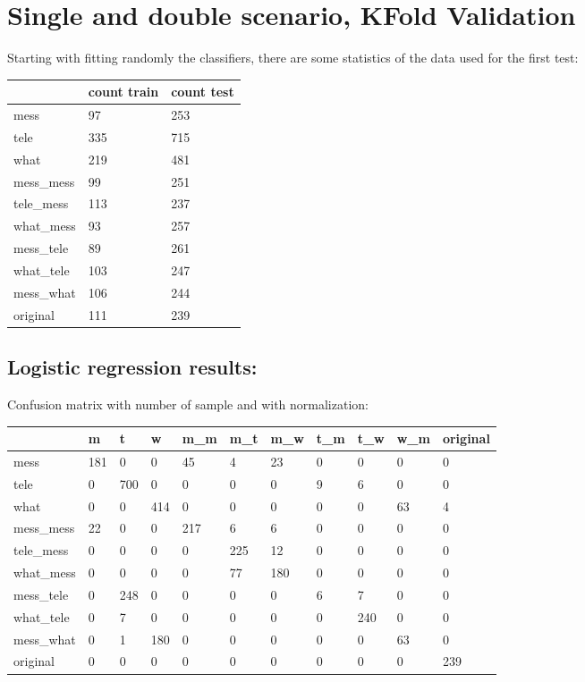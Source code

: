 

\chapter{Single and double scenario, KFold Validation}

Starting with fitting randomly the classifiers, there are some statistics of the data used for the first test: \\
 {\def\arraystretch{1.3} 
 \begin{table}[H] 
\centering 
\begin{tabular}{|l|l|l|} 
\hline 
  &count train  &count test  \\ \hline
mess  &97  &253  \\ \hline
tele  &335  &715  \\ \hline
what  &219  &481  \\ \hline
mess\_mess  &99  &251  \\ \hline
tele\_mess  &113  &237  \\ \hline
what\_mess  &93  &257  \\ \hline
mess\_tele  &89  &261  \\ \hline
what\_tele  &103  &247  \\ \hline
mess\_what  &106  &244  \\ \hline
original  &111  &239  \\ \hline
\end{tabular} 
\end{table} }
\section{Logistic regression results:} 
Confusion matrix with number of sample and with normalization:
 {\def\arraystretch{1.3} 
 \begin{table}[H] 
\centering 
\begin{tabular}{|l|l|l|l|l|l|l|l|l|l|l|} 
\hline 
  &m  &t  &w  &m\_m  &m\_t  &m\_w  &t\_m  &t\_w  &w\_m  &original  \\ \hline
mess  &181  &0  &0  &45  &4  &23  &0  &0  &0  &0  \\ \hline
tele  &0  &700  &0  &0  &0  &0  &9  &6  &0  &0  \\ \hline
what  &0  &0  &414  &0  &0  &0  &0  &0  &63  &4  \\ \hline
mess\_mess  &22  &0  &0  &217  &6  &6  &0  &0  &0  &0  \\ \hline
tele\_mess  &0  &0  &0  &0  &225  &12  &0  &0  &0  &0  \\ \hline
what\_mess  &0  &0  &0  &0  &77  &180  &0  &0  &0  &0  \\ \hline
mess\_tele  &0  &248  &0  &0  &0  &0  &6  &7  &0  &0  \\ \hline
what\_tele  &0  &7  &0  &0  &0  &0  &0  &240  &0  &0  \\ \hline
mess\_what  &0  &1  &180  &0  &0  &0  &0  &0  &63  &0  \\ \hline
original  &0  &0  &0  &0  &0  &0  &0  &0  &0  &239  \\ \hline
\end{tabular} 
\end{table} }

